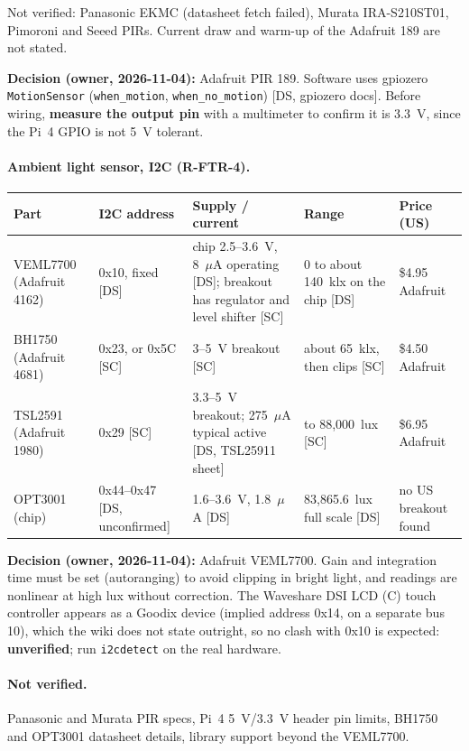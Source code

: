 \documentclass[11pt,a4paper]{article}
\begin{document}
Not verified: Panasonic EKMC (datasheet fetch failed), Murata IRA-S210ST01, Pimoroni and Seeed PIRs. Current draw and warm-up of the Adafruit 189 are not stated.

\textbf{Decision (owner, 2026-11-04):} Adafruit PIR 189. Software uses gpiozero \texttt{MotionSensor} (\texttt{when\_motion}, \texttt{when\_no\_motion}) [DS, gpiozero docs]. Before wiring, \textbf{measure the output pin} with a multimeter to confirm it is 3.3~V, since the Pi~4 GPIO is not 5~V tolerant.

\paragraph{Ambient light sensor, I2C (R-FTR-4).}
\begin{longtable}{p{2.6cm} p{2.8cm} p{3cm} p{2.9cm} p{2.4cm}}
\toprule
\textbf{Part} & \textbf{I2C address} & \textbf{Supply / current} & \textbf{Range} & \textbf{Price (US)} \\
\midrule\endhead
VEML7700 (Adafruit 4162) & 0x10, fixed [DS] & chip 2.5--3.6~V, 8~$\mu$A operating [DS]; breakout has regulator and level shifter [SC] & 0 to about 140~klx on the chip [DS] & \$4.95 Adafruit \\
BH1750 (Adafruit 4681) & 0x23, or 0x5C [SC] & 3--5~V breakout [SC] & about 65~klx, then clips [SC] & \$4.50 Adafruit \\
TSL2591 (Adafruit 1980) & 0x29 [SC] & 3.3--5~V breakout; 275~$\mu$A typical active [DS, TSL25911 sheet] & to 88,000~lux [SC] & \$6.95 Adafruit \\
OPT3001 (chip) & 0x44--0x47 [DS, unconfirmed] & 1.6--3.6~V, 1.8~$\mu$A [DS] & 83,865.6~lux full scale [DS] & no US breakout found \\
\bottomrule
\end{longtable}

\textbf{Decision (owner, 2026-11-04):} Adafruit VEML7700. Gain and integration time must be set (autoranging) to avoid clipping in bright light, and readings are nonlinear at high lux without correction. The Waveshare DSI LCD (C) touch controller appears as a Goodix device (implied address 0x14, on a separate bus 10), which the wiki does not state outright, so no clash with 0x10 is expected: \textbf{unverified}; run \texttt{i2cdetect} on the real hardware.

\paragraph{Not verified.} Panasonic and Murata PIR specs, Pi~4 5~V/3.3~V header pin limits, BH1750 and OPT3001 datasheet details, library support beyond the VEML7700.
\end{document}
